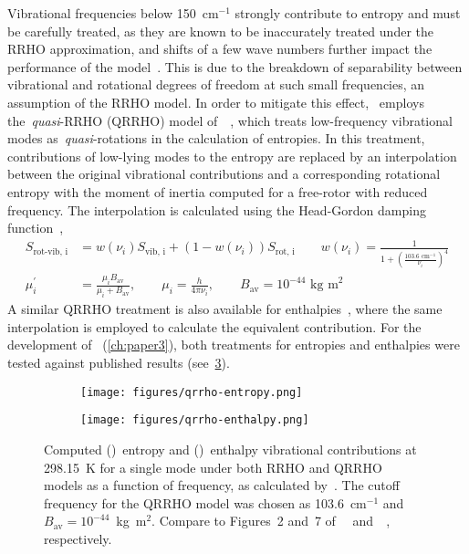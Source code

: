 Vibrational frequencies below 150~cm$^{-1}$ strongly contribute to entropy and must be carefully treated,
as they are known to be inaccurately treated under the RRHO approximation,
and shifts of a few wave numbers further impact the performance of the model~\cite{Ribeiro_2011,Grimme_2012,Jensen_2015,Ryu_2018}.
This is due to the breakdown of separability between vibrational and rotational degrees of freedom at such small frequencies,
an assumption of the RRHO model.
In order to mitigate this effect,
\overreact{}~employs the~\emph{quasi}-RRHO (QRRHO) model of~\citeauthor{Grimme_2012}~\cite{Grimme_2012},
which treats low-frequency vibrational modes as~\emph{quasi}-rotations in the calculation of entropies.
In this treatment,
contributions of low-lying modes to the entropy are replaced by an interpolation
between the original vibrational contributions and a corresponding rotational entropy
with the moment of inertia computed for a free-rotor with reduced frequency.
The interpolation is calculated using the Head-Gordon damping function~\cite{Chai_2008},
% 
\begin{equation}
	\begin{split}
		S_\text{rot-vib,
			i}
		&= w(\nu_i) S_\text{vib,
			i}
		+ \left(
		1 - w(\nu_i)
		\right) S_\text{rot,
			i}
		\qquad
		w(\nu_i) = \frac{1}{
			1 + \left(
			\frac{
				103.6 \text{ cm}^{-1}
			}{\nu_i}
			\right)^4
		} \\
		\mu^\prime_i &= \frac{\mu_i B_\text{av}}{\mu_i + B_\text{av}},
		\qquad
		\mu_i = \frac{h}{4 \pi \nu_i},
		\qquad
		B_\text{av} = 10^{-44} \text{ kg m}^2
	\end{split}
\end{equation}
% 
A similar QRRHO treatment is also available for enthalpies~\cite{Li_2015},
where the same interpolation is employed to calculate the equivalent contribution.
For the development of~\overreact{} (\cref{ch:paper3}),
both treatments for entropies and enthalpies were tested against published results (see~\cref{fig:qrrho}).
% 
\begin{figure}[hbtp]
	\centering
	\begin{subfigure}[c]{0.5\textwidth}
		\centering
		\texttt{[image: figures/qrrho-entropy.png]}
		\caption{}\label{fig:qrrho-entropy}
	\end{subfigure}%
	\begin{subfigure}[c]{0.5\textwidth}
		\centering
		\texttt{[image: figures/qrrho-enthalpy.png]}
		\caption{}\label{fig:qrrho-enthalpy}
	\end{subfigure}%
	\caption[Computed entropy
		and enthalpy vibrational contributions
		for a single mode under both RRHO and QRRHO.]{Computed ()~entropy
		and ()~enthalpy vibrational contributions
		at 298.15~K for a single mode under both RRHO and QRRHO~\cite{Grimme_2012,Li_2015} models
		as a function of frequency,
		as calculated by~\overreact{}.
		The cutoff frequency for the QRRHO model was chosen as 103.6~cm$^{-1}$ and~$B_\text{av} = 10^{-44}$~kg~m$^2$.
		Compare to Figures~2 and~7 of~\citeauthor{Grimme_2012}~\cite{Grimme_2012} and~\citeauthor{Li_2015}~\cite{Li_2015},
		respectively.}\label{fig:qrrho}
\end{figure}
